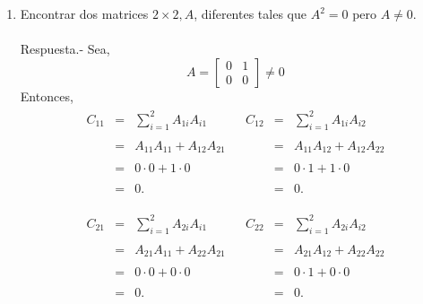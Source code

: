 \begin{enumerate}[1.]
    \item Encontrar dos matrices $2\times 2,A$, diferentes tales que $A^2=0$ pero $A\neq 0.$\\\\
	Respuesta.-\; Sea,
	$$A=\left[\begin{array}{rr}
	    0 & 1\\
	    0 & 0 
	\end{array}\right]\neq 0$$
	Entonces,
	$$
	\begin{array}{c|c}
	    \begin{array}{rcl}
		C_{11} &=& \displaystyle \sum_{i=1}^2 A_{1i}A_{i1}\\\\
		       &=& A_{11}A_{11} + A_{12}A_{21}\\\\
		       &=& 0\cdot 0 + 1\cdot 0\\\\
		       &=& 0.
	    \end{array}&
	    \begin{array}{rcl}
		C_{12} &=& \displaystyle \sum_{i=1}^2 A_{1i}A_{i2}\\\\
		       &=& A_{11}A_{12} + A_{12}A_{22}\\\\
		       &=& 0\cdot 1 + 1\cdot 0\\\\
		       &=& 0.
	    \end{array}\\\\
	\end{array}
	$$
	$$
	\begin{array}{c|c}
	    \begin{array}{rcl}
		C_{21} &=& \displaystyle \sum_{i=1}^2 A_{2i}A_{i1}\\\\
		       &=& A_{21}A_{11} + A_{22}A_{21}\\\\
		       &=& 0\cdot 0 + 0\cdot 0\\\\
		       &=& 0.
	    \end{array}&
	    \begin{array}{rcl}
		C_{22} &=& \displaystyle \sum_{i=1}^2 A_{2i}A_{i2}\\\\
		       &=& A_{21}A_{12} + A_{22}A_{22}\\\\
		       &=& 0\cdot 1 + 0\cdot 0\\\\
		       &=& 0.
	    \end{array}\\\\
	\end{array}
	$$


\end{enumerate}
